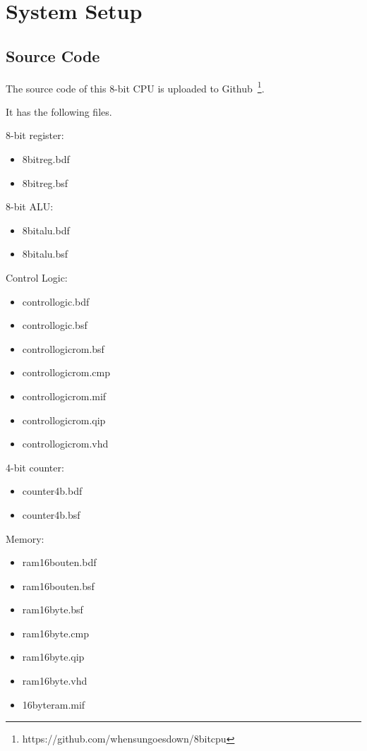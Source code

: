\section{System Setup}
\label{sec:setup}

\subsection{Source Code}

The source code of this 8-bit CPU is uploaded to Github~\footnote{https://github.com/whensungoesdown/8bitcpu}.

It has the following files.

8-bit register:
\begin{itemize}
	\item 8bitreg.bdf
	\item 8bitreg.bsf
\end{itemize}

8-bit ALU:
\begin{itemize}
	\item 8bitalu.bdf
	\item 8bitalu.bsf
\end{itemize}

Control Logic:
\begin{itemize}
	\item controllogic.bdf
	\item controllogic.bsf
	\item controllogicrom.bsf
	\item controllogicrom.cmp
	\item controllogicrom.mif
	\item controllogicrom.qip
	\item controllogicrom.vhd
\end{itemize}

4-bit counter:
\begin{itemize}
	\item counter4b.bdf
	\item counter4b.bsf
\end{itemize}

Memory:
\begin{itemize}
	\item ram16bouten.bdf
	\item ram16bouten.bsf
	\item ram16byte.bsf
	\item ram16byte.cmp
	\item ram16byte.qip
	\item ram16byte.vhd
	\item 16byteram.mif
\end{itemize}

